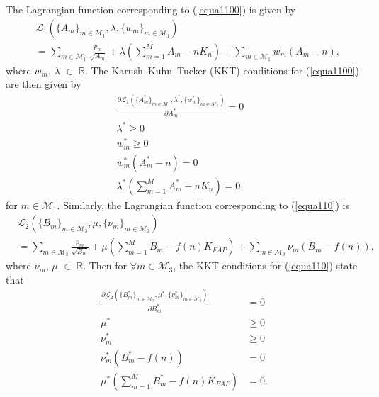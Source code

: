 \documentclass[10pt,journal,compsoc,onecolumn]{IEEEtran}
\begin{document}
The Lagrangian function corresponding to (\ref{equa1100}) is given by
\begin{align}
\label{equa13}
&\mathcal{L}_1 \left( \lbrace A_m\rbrace _{m \in \mathcal{M}_1},\lambda,\lbrace w_m\rbrace _{m \in \mathcal{M}_1} \right)\nonumber\\&=\!\sum_{m\!\in\!\mathcal{M}_1}\! \frac{p_m}{\sqrt{\!A_m\!}}\!+\!\lambda\!\left(\!\sum_{m=1}^M \! A_m\!-\!n\!K_n\!\right)\!+\!\sum_{m\in\mathcal{M}_1} w_m(A_m-n),
\end{align}
where $w_m$, $\lambda$ $\in$ $\mathbb{R}$. The Karush--Kuhn--Tucker (KKT) conditions for (\ref{equa1100}) are then given by
\begin{align}
\frac{\partial \mathcal{L}_1 \left( \lbrace A_m^*\rbrace _{m \in \mathcal{M}_1},\lambda^*,\lbrace w_m^*\rbrace _{m \in \mathcal{M}_1} \right)}{\partial A_m^*}  =0& \label{AAA}\\
\lambda^*  \geq 0 &\nonumber\\
   w^*_m  \geq 0& \nonumber\\
   w^*_m(A_m^*-n)  =0& \label{A}\\
          \lambda^*\left(\sum_{m=1}^M A_m^*-nK_n\right)  =0\label{AA}
  \end{align}
for $m \in \mathcal{M}_1$.
Similarly, the Lagrangian function corresponding to (\ref{equa110}) is
\begin{equation}
\label{equa13b}
\begin{split}
&\mathcal{L}_2 \left( \lbrace B_m\rbrace _{m \in
\mathcal{M}_3},\mu,\lbrace \nu_m\rbrace _{m \in \mathcal{M}_3}
\right)\\&=\!\sum_{m\!\in\!\mathcal{M}_3}\!
\frac{p_m}{\sqrt{\!B_m\!}}\!+\!\mu\!\left(\!\sum_{m=1}^M\!
B_m\!-\!f(\!n\!)\!K_{F\!A\!P}\!\right)\!+\!\!\sum_{m\!\in\!\mathcal{M}_3}\!\!
\nu_m(\!B_m\!-\!f(\!n\!))\!,
\end{split}
\end{equation}
where $\nu_m$, $\mu$ $\in$ $\mathbb{R}$. Then for $\forall m \in \mathcal{M}_3$, the KKT conditions for (\ref{equa110}) state that
\begin{align}
\frac{\partial \mathcal{L}_2 \left( \lbrace B_m^*\rbrace _{m \in \mathcal{M}_3},\mu^*,\lbrace \nu_m^*\rbrace _{m \in \mathcal{M}_3} \right) }{\partial B_m^*} & =0 \nonumber \\
\mu^* & \geq 0  \nonumber\\
   \nu^*_m & \geq 0 \nonumber\\
   \nu^*_m(B_m^*-f(n))&  =0  \nonumber\\
          \mu^*\left(\sum_{m=1}^M B_m^*-f(n)K_{FAP}\right)  &=0. \label{BBB}
  \end{align}
\end{document}
